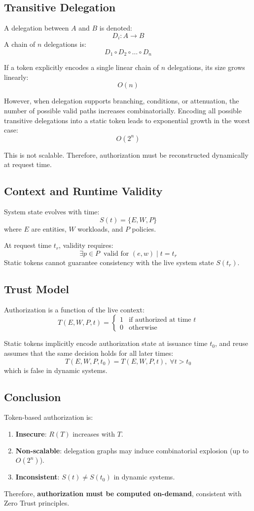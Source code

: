 \subsection{Transitive Delegation}
A delegation between $A$ and $B$ is denoted:
\[
D_i : A \rightarrow B
\]
A chain of $n$ delegations is:
\[
D_1 \circ D_2 \circ \dots \circ D_n
\]

If a token explicitly encodes a single linear chain of $n$ delegations, 
its size grows linearly:
\[
O(n)
\]

However, when delegation supports branching, conditions, or attenuation, 
the number of possible valid paths increases combinatorially. 
Encoding all possible transitive delegations into a static token leads to exponential growth in the worst case:
\[
O(2^n)
\]

This is not scalable. Therefore, authorization must be reconstructed dynamically at request time.

\subsection{Context and Runtime Validity}
System state evolves with time:
\[
S(t) = \{E, W, P\}
\]
where $E$ are entities, $W$ workloads, and $P$ policies.  

At request time $t_r$, validity requires:
\[
\exists p \in P \;\; \text{valid for } (e,w) \mid t=t_r
\]
Static tokens cannot guarantee consistency with the live system state $S(t_r)$.

\subsection{Trust Model}
Authorization is a function of the live context:
\[
T(E, W, P, t) =
\begin{cases}
1 & \text{if authorized at time $t$}\\
0 & \text{otherwise}
\end{cases}
\]

Static tokens implicitly encode authorization state at issuance time $t_0$, 
and reuse assumes that the same decision holds for all later times:
\[
T(E,W,P,t_0) = T(E,W,P,t), \; \forall t>t_0
\]
which is false in dynamic systems.

\subsection{Conclusion}
Token-based authorization is:
\begin{enumerate}
\item \textbf{Insecure}: $R(T)$ increases with $T$.
\item \textbf{Non-scalable}: delegation graphs may induce combinatorial explosion (up to $O(2^n)$).
\item \textbf{Inconsistent}: $S(t) \neq S(t_0)$ in dynamic systems.
\end{enumerate}
Therefore, \textbf{authorization must be computed on-demand}, consistent with Zero Trust principles.

